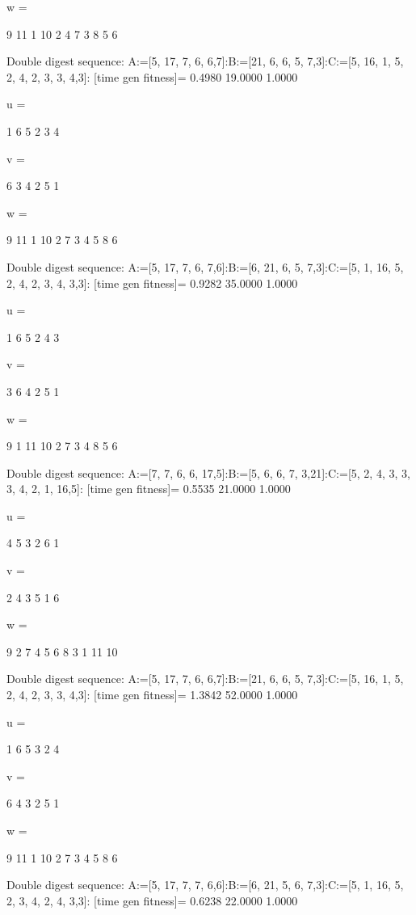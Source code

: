 w =

     9    11     1    10     2     4     7     3     8     5     6

Double digest sequence:
A:=[5, 17, 7, 6, 6,7]:B:=[21, 6, 6, 5, 7,3]:C:=[5, 16, 1, 5, 2, 4, 2, 3, 3, 4,3]:
[time gen fitness]=
    0.4980   19.0000    1.0000


u =

     1     6     5     2     3     4


v =

     6     3     4     2     5     1


w =

     9    11     1    10     2     7     3     4     5     8     6

Double digest sequence:
A:=[5, 17, 7, 6, 7,6]:B:=[6, 21, 6, 5, 7,3]:C:=[5, 1, 16, 5, 2, 4, 2, 3, 4, 3,3]:
[time gen fitness]=
    0.9282   35.0000    1.0000


u =

     1     6     5     2     4     3


v =

     3     6     4     2     5     1


w =

     9     1    11    10     2     7     3     4     8     5     6

Double digest sequence:
A:=[7, 7, 6, 6, 17,5]:B:=[5, 6, 6, 7, 3,21]:C:=[5, 2, 4, 3, 3, 3, 4, 2, 1, 16,5]:
[time gen fitness]=
    0.5535   21.0000    1.0000


u =

     4     5     3     2     6     1


v =

     2     4     3     5     1     6


w =

     9     2     7     4     5     6     8     3     1    11    10

Double digest sequence:
A:=[5, 17, 7, 6, 6,7]:B:=[21, 6, 6, 5, 7,3]:C:=[5, 16, 1, 5, 2, 4, 2, 3, 3, 4,3]:
[time gen fitness]=
    1.3842   52.0000    1.0000


u =

     1     6     5     3     2     4


v =

     6     4     3     2     5     1


w =

     9    11     1    10     2     7     3     4     5     8     6

Double digest sequence:
A:=[5, 17, 7, 7, 6,6]:B:=[6, 21, 5, 6, 7,3]:C:=[5, 1, 16, 5, 2, 3, 4, 2, 4, 3,3]:
[time gen fitness]=
    0.6238   22.0000    1.0000


